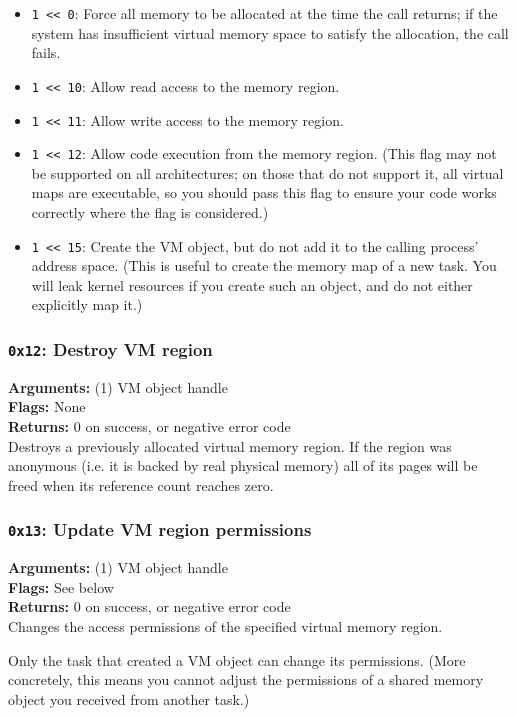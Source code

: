 \documentclass[11pt]{article}
\begin{document}
\begin{itemize}
\item \texttt{1 << 0}: Force all memory to be allocated at the time the call returns; if the system has insufficient virtual memory space to satisfy the allocation, the call fails.
\item \texttt{1 << 10}: Allow read access to the memory region.
\item \texttt{1 << 11}: Allow write access to the memory region.
\item \texttt{1 << 12}: Allow code execution from the memory region. (This flag may not be supported on all architectures; on those that do not support it, all virtual maps are executable, so you should pass this flag to ensure your code works correctly where the flag is considered.)
\item \texttt{1 << 15}: Create the VM object, but do not add it to the calling process' address space. (This is useful to create the memory map of a new task. You will leak kernel resources if you create such an object, and do not either explicitly map it.)
\end{itemize}

\subsubsection{{\tt 0x12}: Destroy VM region}
\textbf{Arguments:} (1) VM object handle \\
\textbf{Flags:} None \\
\textbf{Returns:} 0 on success, or negative error code \\

Destroys a previously allocated virtual memory region. If the region was anonymous (i.e. it is backed by real physical memory) all of its pages will be freed when its reference count reaches zero.

\subsubsection{{\tt 0x13}: Update VM region permissions}
\textbf{Arguments:} (1) VM object handle \\
\textbf{Flags:} See below \\
\textbf{Returns:} 0 on success, or negative error code \\

Changes the access permissions of the specified virtual memory region.

Only the task that created a VM object can change its permissions. (More concretely, this means you cannot adjust the permissions of a shared memory object you received from another task.)
\end{document}
